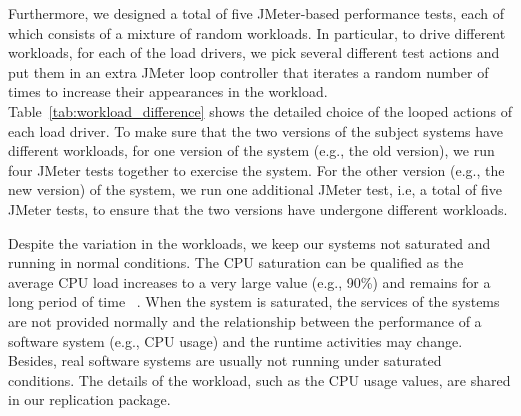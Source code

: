 Furthermore, we designed a total of five JMeter-based performance tests, each of which consists of a mixture of random workloads. %
In particular, to drive different workloads, for each of the load drivers, we pick several different test actions and put them in an extra JMeter loop controller that iterates a random number of times to increase their appearances in the workload. Table~\ref{tab:workload_difference} shows the detailed choice of the looped actions of each load driver. 
To make sure that the two versions of the subject systems have different workloads, for one version of the system (e.g., the old version), we run four JMeter tests together to exercise the system. For the other version (e.g., the new version) of the system, we run one additional JMeter test, i.e, a total of five JMeter tests, to ensure that the two versions have undergone different workloads.

Despite the variation in the workloads, we keep our systems not saturated and running in normal conditions. The  CPU  saturation  can  be  qualified as the average CPU load increases to a very large value (e.g., 90\%) and remains for a long period of time ~\citep{10.1117/12.705735}. When the system is saturated, the services of the systems are not provided normally and the relationship between the performance of a software system (e.g.,  CPU usage) and the runtime activities may change. Besides, real software systems are usually not running under saturated conditions.  
The details of the workload, such as the CPU usage values, are shared in our replication package. 

